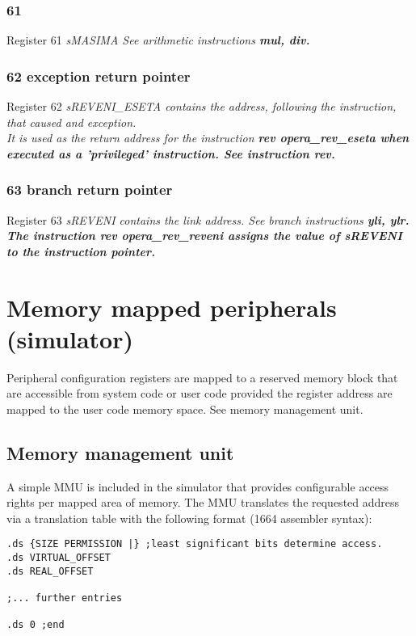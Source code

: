 \documentclass[a4paper,11pt]{article}
\begin{document}
\subsubsection{61}
Register 61 \sl sMASIMA \rm See arithmetic instructions \bf mul\rm, \bf div\rm.

\subsubsection{62 exception return pointer}
Register 62 \sl sREVENI\_ESETA \rm contains the address, following the instruction, that caused and exception.\\
It is used as the return address for the instruction \bf rev opera\_rev\_eseta \rm when executed as a 'privileged' instruction. See instruction \bf rev\rm.

\subsubsection{63 branch return pointer}
Register 63 \sl sREVENI \rm contains the link address. See branch instructions \bf yli, ylr\rm. \\
The instruction \bf rev opera\_rev\_reveni \rm assigns the value of \sl sREVENI \rm to the instruction pointer.

\pagebreak
\section{Memory mapped peripherals (simulator)}
Peripheral configuration registers are mapped to a reserved memory block that are accessible from system code or user code provided the register address are mapped to the user code memory space. See memory management unit.

\subsection{Memory management unit}
A simple MMU is included in the simulator that provides configurable access rights per mapped area of memory. The MMU translates the requested address via a translation table with the following format (1664 assembler syntax):\\

\begin{verbatim}
.ds {SIZE PERMISSION |} ;least significant bits determine access.
.ds VIRTUAL_OFFSET
.ds REAL_OFFSET

;... further entries

.ds 0 ;end
\end{verbatim}
\end{document}
